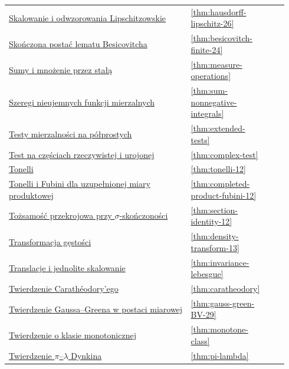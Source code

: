 \documentclass[11pt,a4paper,oneside]{book}
\numberwithin{equation}{chapter}
\theoremstyle{plain}
\theoremstyle{definition}
\theoremstyle{remark}
\begin{document}
\begin{longtable}{@{}p{0.72\linewidth}p{0.135\linewidth}p{0.08\linewidth}@{}}
\hyperref[thm:hausdorff-lipschitz-26]{Skalowanie i odwzorowania Lipschitzowskie} & \ref*{thm:hausdorff-lipschitz-26} & \pageref*{thm:hausdorff-lipschitz-26} \\
\hyperref[thm:besicovitch-finite-24]{Skończona postać lematu Besicovitcha} & \ref*{thm:besicovitch-finite-24} & \pageref*{thm:besicovitch-finite-24} \\
\hyperref[thm:measure-operations]{Sumy i mnożenie przez stałą} & \ref*{thm:measure-operations} & \pageref*{thm:measure-operations} \\
\hyperref[thm:sum-nonnegative-integrals]{Szeregi nieujemnych funkcji mierzalnych} & \ref*{thm:sum-nonnegative-integrals} & \pageref*{thm:sum-nonnegative-integrals} \\
\hyperref[thm:extended-tests]{Testy mierzalności na półprostych} & \ref*{thm:extended-tests} & \pageref*{thm:extended-tests} \\
\hyperref[thm:complex-test]{Test na częściach rzeczywistej i urojonej} & \ref*{thm:complex-test} & \pageref*{thm:complex-test} \\
\hyperref[thm:tonelli-12]{Tonelli} & \ref*{thm:tonelli-12} & \pageref*{thm:tonelli-12} \\
\hyperref[thm:completed-product-fubini-12]{Tonelli i Fubini dla uzupełnionej miary produktowej} & \ref*{thm:completed-product-fubini-12} & \pageref*{thm:completed-product-fubini-12} \\
\hyperref[thm:section-identity-12]{Tożsamość przekrojowa przy $\sigma$-skończoności} & \ref*{thm:section-identity-12} & \pageref*{thm:section-identity-12} \\
\hyperref[thm:density-transform-13]{Transformacja gęstości} & \ref*{thm:density-transform-13} & \pageref*{thm:density-transform-13} \\
\hyperref[thm:invariance-lebesgue]{Translacje i jednolite skalowanie} & \ref*{thm:invariance-lebesgue} & \pageref*{thm:invariance-lebesgue} \\
\hyperref[thm:caratheodory]{Twierdzenie Carathéodory'ego} & \ref*{thm:caratheodory} & \pageref*{thm:caratheodory} \\
\hyperref[thm:gauss-green-BV-29]{Twierdzenie Gaussa--Greena w postaci miarowej} & \ref*{thm:gauss-green-BV-29} & \pageref*{thm:gauss-green-BV-29} \\
\hyperref[thm:monotone-class]{Twierdzenie o klasie monotonicznej} & \ref*{thm:monotone-class} & \pageref*{thm:monotone-class} \\
\hyperref[thm:pi-lambda]{Twierdzenie $\pi$--$\lambda$ Dynkina} & \ref*{thm:pi-lambda} & \pageref*{thm:pi-lambda} \\

\end{longtable}
\end{document}
